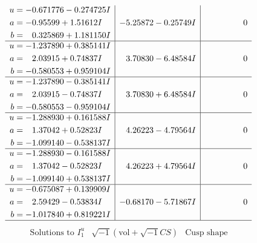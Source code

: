 \documentclass[1p]{elsarticle_modified}
\theoremstyle{definition}
\newcommand{\I}{\sqrt{-1}}
\begin{document}
$$\begin{array}{c|c|c}
\begin{aligned}
u &= -0.671776 - 0.274725 I \\
a &= -0.95599 + 1.51612 I \\
b &= \phantom{-}0.325869 + 1.181150 I\end{aligned}
 & -5.25872 - 0.25749 I & \phantom{-0.000000 } 0 \\ \hline\begin{aligned}
u &= -1.237890 + 0.385141 I \\
a &= \phantom{-}2.03915 + 0.74837 I \\
b &= -0.580553 + 0.959104 I\end{aligned}
 & \phantom{-}3.70830 - 6.48584 I & \phantom{-0.000000 } 0 \\ \hline\begin{aligned}
u &= -1.237890 - 0.385141 I \\
a &= \phantom{-}2.03915 - 0.74837 I \\
b &= -0.580553 - 0.959104 I\end{aligned}
 & \phantom{-}3.70830 + 6.48584 I & \phantom{-0.000000 } 0 \\ \hline\begin{aligned}
u &= -1.288930 + 0.161588 I \\
a &= \phantom{-}1.37042 + 0.52823 I \\
b &= -1.099140 - 0.538137 I\end{aligned}
 & \phantom{-}4.26223 - 4.79564 I & \phantom{-0.000000 } 0 \\ \hline\begin{aligned}
u &= -1.288930 - 0.161588 I \\
a &= \phantom{-}1.37042 - 0.52823 I \\
b &= -1.099140 + 0.538137 I\end{aligned}
 & \phantom{-}4.26223 + 4.79564 I & \phantom{-0.000000 } 0 \\ \hline\begin{aligned}
u &= -0.675087 + 0.139909 I \\
a &= \phantom{-}2.59429 - 0.53834 I \\
b &= -1.017840 + 0.819221 I\end{aligned}
 & -0.68170 - 5.71867 I & \phantom{-0.000000 } 0\\
 \hline 
 \end{array}$$\newpage$$\begin{array}{c|c|c}  
\text{Solutions to }I^u_{1}& \I (\text{vol} + \sqrt{-1}CS) & \text{Cusp shape}\\
 \hline 
\begin{aligned}

\end{aligned}
\end{array}$$
\end{document}
